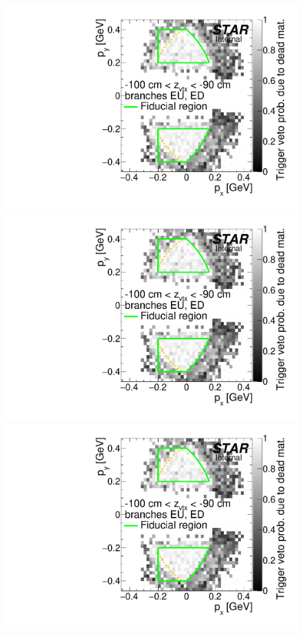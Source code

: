 \begin{figure}[hb]
{}~
\parbox{0.495\textwidth}{
  \centering
  \includegraphics[width=\linewidth,page=10]{graphics/corrections/mcDeadMatProbPxPy.pdf}\\
  \includegraphics[width=\linewidth,page=12]{graphics/corrections/mcDeadMatProbPxPy.pdf}\\
  \includegraphics[width=\linewidth,page=14]{graphics/corrections/mcDeadMatProbPxPy.pdf}
}%
\end{figure}
